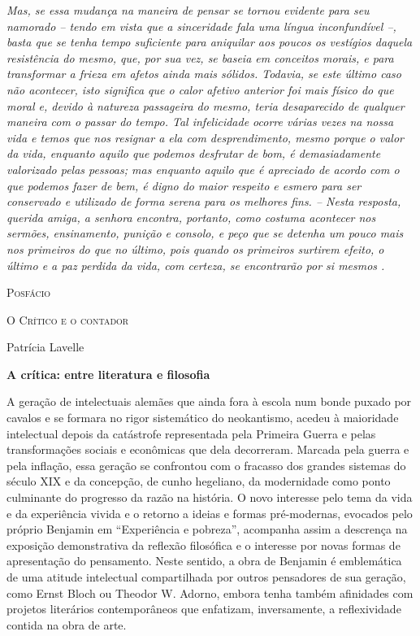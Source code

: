 \emph{Mas, se essa mudança na maneira de pensar se tornou evidente para
seu namorado -- tendo em vista que a sinceridade fala uma língua
inconfundível --, basta que se tenha tempo suficiente para aniquilar aos
poucos os vestígios daquela resistência do mesmo, que, por sua vez, se
baseia em conceitos morais, e para transformar a frieza em afetos ainda
mais sólidos. Todavia, se este último caso não acontecer, isto significa
que o calor afetivo anterior foi mais físico do que moral e, devido à
natureza passageira do mesmo, teria desaparecido de qualquer maneira com
o passar do tempo. Tal infelicidade ocorre várias vezes na nossa vida e
temos que nos resignar a ela com desprendimento, mesmo porque o valor da
vida, enquanto aquilo que podemos desfrutar de bom, é demasiadamente
valorizado pelas pessoas; mas enquanto aquilo que é apreciado de acordo
com o que podemos fazer de bem, é digno do maior respeito e esmero para
ser conservado e utilizado de forma serena para os melhores fins. --
Nesta resposta, querida amiga, a senhora encontra, portanto, como
costuma acontecer nos sermões, ensinamento, punição e consolo, e peço
que se detenha um pouco mais nos primeiros do que no último, pois quando
os primeiros surtirem efeito, o último e a paz perdida da vida, com
certeza, se encontrarão por si mesmos .}

\textsc{Posfácio}

\textsc{O Crítico e o contador}

Patrícia Lavelle

\textbf{A crítica: entre literatura e filosofia}

A geração de intelectuais alemães que ainda fora à escola num bonde
puxado por cavalos e se formara no rigor sistemático do neokantismo,
acedeu à maioridade intelectual depois da catástrofe representada pela
Primeira Guerra e pelas transformações sociais e econômicas que dela
decorreram. Marcada pela guerra e pela inflação, essa geração se
confrontou com o fracasso dos grandes sistemas do século XIX e da
concepção, de cunho hegeliano, da modernidade como ponto culminante do
progresso da razão na história. O novo interesse pelo tema da vida e da
experiência vivida e o retorno a ideias e formas pré-modernas, evocados
pelo próprio Benjamin em ``Experiência e pobreza'', acompanha assim a
descrença na exposição demonstrativa da reflexão filosófica e o
interesse por novas formas de apresentação do pensamento. Neste sentido,
a obra de Benjamin é emblemática de uma atitude intelectual
compartilhada por outros pensadores de sua geração, como Ernst Bloch ou
Theodor W. Adorno, embora tenha também afinidades com projetos
literários contemporâneos que enfatizam, inversamente, a reflexividade
contida na obra de arte.

